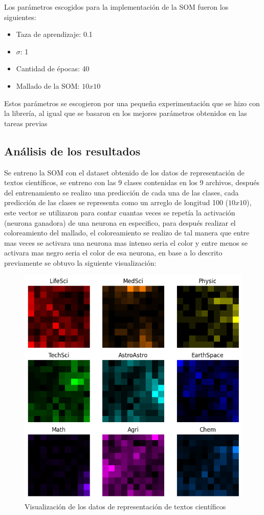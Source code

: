 \documentclass{article}
\theoremstyle{mytheoremstyle}
\theoremstyle{mytheoremstyle}
\theoremstyle{myproblemstyle}
\begin{document}
Los parámetros escogidos para la implementación de la SOM fueron los siguientes:

\begin{itemize}
  \item Taza de aprendizaje: 0.1
  \item $\sigma$: 1
  \item Cantidad de épocas: 40
  \item Mallado de la SOM: $10x10$
\end{itemize}

Estos parámetros se escogieron por una pequeña experimentación que se hizo con la librería, al igual que se basaron en los mejores parámetros obtenidos en las tareas previas

\subsection*{Análisis de los resultados}

Se entreno la SOM con el dataset obtenido de los datos de representación de textos científicos, se entreno con las 9 clases contenidas en los 9 archivos, después del entrenamiento se realizo una predicción de cada una de las clases, cada predicción de las clases se representa como un arreglo de longitud 100 ($10x10$), este vector se utilizaron para contar cuantas veces se repetía la activación (neurona ganadora) de una neurona en especifico, para después realizar el coloreamiento del mallado, el coloreamiento se realizo de tal manera que entre mas veces se activara una neurona mas intenso seria el color y entre menos se activara mas negro seria el color de esa neurona, en base a lo descrito previamente se obtuvo la siguiente visualización:

\begin{figure}[!ht]
  \centering
  \includegraphics[width=0.7\linewidth]{images/output.png}
  \caption{Visualización de los datos de representación de textos científicos}
  \label{fig:output}
\end{figure}
\end{document}
